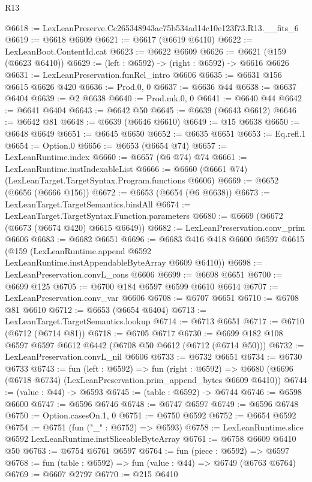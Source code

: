 \begin{lexlean}{R13}
\begin{coremodule}
@6618 := LexLeanPreserve.Cc265348943ac75b534ad14c10e123f73.R13.__fits_6
@6619 := @6618 @6609
@6621 := @6617 (@6619 @6410)
@6622 := LexLeanBoot.ContentId.cat
@6623 := @6622 @6609
@6626 := @6621 (@159 (@6623 @6410))
@6629 := (left : @6592) -> (right : @6592) -> @6616 @6626
@6631 := LexLeanPreservation.funRel_intro @6606
@6635 := @6631 @156 @6615 @6626 @420
@6636 := Prod.{0, 0}
@6637 := @6636 @44
@6638 := @6637 @6404
@6639 := @2 @6638
@6640 := Prod.mk.{0, 0}
@6641 := @6640 @44
@6642 := @6641 @6404
@6643 := @6642 @50
@6645 := @6639 (@6643 @6612)
@6646 := @6642 @81
@6648 := @6639 (@6646 @6610)
@6649 := @15 @6638
@6650 := @6648 @6649
@6651 := @6645 @6650
@6652 := @6635 @6651
@6653 := Eq.refl.{1}
@6654 := Option.{0}
@6656 := @6653 (@6654 @74)
@6657 := LexLeanRuntime.index
@6660 := @6657 (@6 @74) @74
@6661 := LexLeanRuntime.instIndexableList
@6666 := @6660 (@6661 @74) (LexLeanTarget.TargetSyntax.Program.functions @6606)
@6669 := @6652 (@6656 (@6666 @156))
@6672 := @6653 (@6654 (@6 @6638))
@6673 := LexLeanTarget.TargetSemantics.bindAll
@6674 := LexLeanTarget.TargetSyntax.Function.parameters
@6680 := @6669 (@6672 (@6673 (@6674 @420) @6615 @6649))
@6682 := LexLeanPreservation.conv_prim @6606
@6683 := @6682 @6651
@6696 := @6683
    @416
    @418
    @6600
    @6597
    @6615
    (@159 (LexLeanRuntime.append @6592 LexLeanRuntime.instAppendableByteArray @6609 @6410))
@6698 := LexLeanPreservation.convL_cons @6606
@6699 := @6698 @6651
@6700 := @6699 @125
@6705 := @6700 @184 @6597 @6599 @6610 @6614
@6707 := LexLeanPreservation.conv_var @6606
@6708 := @6707 @6651
@6710 := @6708 @81 @6610
@6712 := @6653 (@6654 @6404)
@6713 := LexLeanTarget.TargetSemantics.lookup
@6714 := @6713 @6651
@6717 := @6710 (@6712 (@6714 @81))
@6718 := @6705 @6717
@6730 := @6699 @182 @108 @6597 @6597 @6612 @6442 (@6708 @50 @6612 (@6712 (@6714 @50)))
@6732 := LexLeanPreservation.convL_nil @6606
@6733 := @6732 @6651
@6734 := @6730 @6733
@6743 := fun (left : @6592) =>
  fun (right : @6592) =>
  @6680 (@6696 (@6718 @6734) (LexLeanPreservation.prim_append_bytes @6609 @6410))
@6744 := (value : @44) -> @6593
@6745 := (table : @6592) -> @6744
@6746 := @6598 @6600
@6747 := @6596 @6746
@6748 := @6747 @6597
@6749 := @6596 @6748
@6750 := Option.casesOn.{1, 0}
@6751 := @6750 @6592
@6752 := @6654 @6592
@6754 := @6751 (fun ("_" : @6752) => @6593)
@6758 := LexLeanRuntime.slice @6592 LexLeanRuntime.instSliceableByteArray
@6761 := @6758 @6609 @6410 @50
@6763 := @6754 @6761 @6597
@6764 := fun (piece : @6592) => @6597
@6768 := fun (table : @6592) => fun (value : @44) => @6749 (@6763 @6764)
@6769 := @6607 @2797
@6770 := @215 @6410

\end{coremodule}
\end{lexlean}
